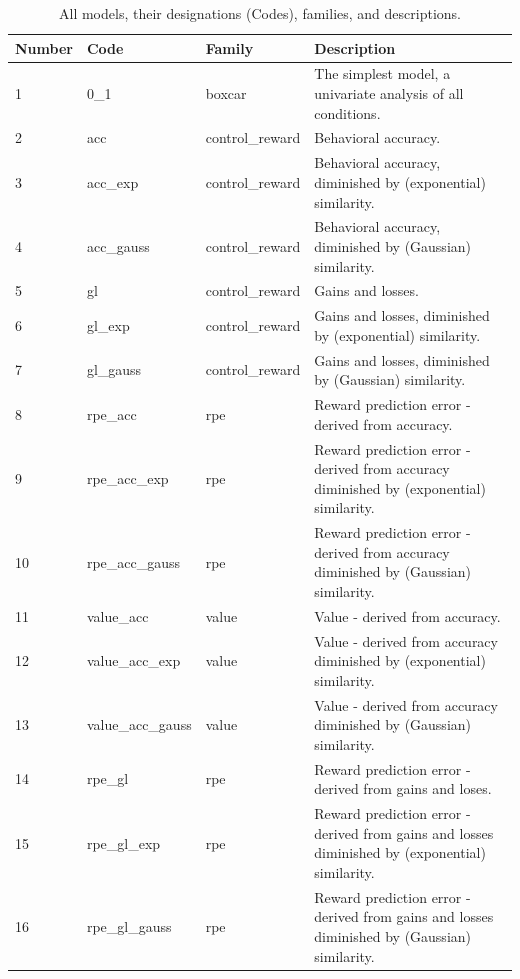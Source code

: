 \documentclass[doc,12pt]{apa}        %
\begin{document}
\newpage
\begin{center}
    \begin{longtable}{ | l | l | l | p{6cm} |}
    \caption{All models, their designations (Codes), families, and descriptions.}\\
    \hline
    Number & Code & Family & Description \\ \hline
         1 & 0\_1 & boxcar & The simplest model, a univariate analysis of all conditions. \\ \hline
         2 & acc & control\_reward & Behavioral accuracy. \\ \hline
         3 & acc\_exp & control\_reward & Behavioral accuracy, diminished by (exponential) similarity. \\ \hline
         4 & acc\_gauss & control\_reward & Behavioral accuracy, diminished by (Gaussian) similarity. \\ \hline
         5 & gl & control\_reward & Gains and losses. \\ \hline 
         6 & gl\_exp & control\_reward & Gains and losses, diminished by (exponential) similarity. \\ \hline
         7 & gl\_gauss & control\_reward & Gains and losses, diminished by (Gaussian) similarity. \\ \hline
         8 & rpe\_acc & rpe & Reward prediction error - derived from accuracy. \\ \hline
         9 & rpe\_acc\_exp & rpe & Reward prediction error - derived from accuracy diminished by (exponential) similarity. \\ \hline
        10 & rpe\_acc\_gauss & rpe & Reward prediction error - derived from accuracy diminished by (Gaussian) similarity. \\ \hline
        11 & value\_acc & value & Value - derived from accuracy. \\ \hline
        12 & value\_acc\_exp & value & Value - derived from accuracy diminished by (exponential) similarity. \\ \hline
        13 & value\_acc\_gauss & value & Value - derived from accuracy diminished by (Gaussian) similarity. \\ \hline
        14 & rpe\_gl & rpe & Reward prediction error - derived from gains and loses. \\ \hline
        15 & rpe\_gl\_exp & rpe & Reward prediction error - derived from gains and losses diminished by (exponential) similarity. \\ \hline
        16 & rpe\_gl\_gauss & rpe & Reward prediction error - derived from gains and losses diminished by (Gaussian) similarity. \\ \hline

\end{longtable}
\end{center}
\end{document}

